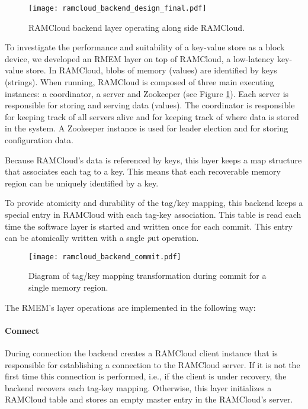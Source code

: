 
\begin{figure}[t!]
\begin{center}
\texttt{[image: ramcloud\_backend\_design\_final.pdf]}
\end{center}
\caption{RAMCloud backend layer operating along side RAMCloud.}
\label{fig:ramcloud_backend_design}
\end{figure}

To investigate the performance and suitability of a key-value store as a block
device, we developed an RMEM layer on top of RAMCloud, a low-latency
key-value store.  In RAMCloud, blobs of memory (values) are identified by keys
(strings). When running, RAMCloud is composed of three main executing
instances: a coordinator, a server and Zookeeper (see Figure
\ref{fig:ramcloud_backend_design}).  Each server is responsible for storing and
serving data (values). The coordinator is responsible for keeping track of all
servers alive and for keeping track of where data is stored in the system.  A
Zookeeper instance is used for leader election and for storing configuration
data.

Because RAMCloud's data is referenced by keys, this layer keeps a map structure
that associates each tag to a key. This means that each recoverable memory
region can be uniquely identified by a key.

To provide atomicity and durability of the tag/key mapping, this backend keeps
a special entry in RAMCloud with each tag-key association. This table is read
each time the software layer is started and written once for each commit. This
entry can be atomically written with a sngle {\emph put} operation.

\begin{figure}[t!]
\begin{center}
\texttt{[image: ramcloud\_backend\_commit.pdf]}
\end{center}
\caption{Diagram of tag/key mapping transformation during commit for a single memory region.}
\label{fig:ramcloud_backend_commit}
\end{figure}

The RMEM's layer operations are implemented in the following way:

\paragraph {\bf Connect} During connection the backend creates a RAMCloud
client instance that is responsible for establishing a connection to the
RAMCloud server.  If it is not the first time this connection is performed,
i.e., if the client is under recovery, the backend recovers each tag-key
mapping.  Otherwise, this layer initializes a RAMCloud table and stores an
empty master entry in the RAMCloud's server. 

